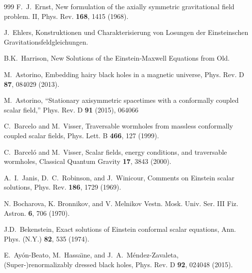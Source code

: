 \documentclass[aps,preprint,groupedaddress,nofootinbib,superscriptaddress,showkeys,showpacs,eqsecnum,amsmath,amssymb]{revtex4-1}
\begin{document}
\begin{thebibliography}{999}
F.~J.~Ernst,
New formulation of the axially symmetric gravitational field problem. II,
Phys. Rev. \textbf{168}, 1415 (1968).


J.~Ehlers,
Konstruktionen und Charakterisierung von Losungen der Einsteinschen Gravitationsfeldgleichungen.

B.K.~Harrison,
New Solutions of the Einstein‐Maxwell Equations from Old.

M.~Astorino,
Embedding hairy black holes in a magnetic universe,
Phys. Rev. D \textbf{87}, 084029 (2013).


M.~Astorino,
``Stationary axisymmetric spacetimes with a conformally coupled scalar field,''
Phys. Rev. D \textbf{91} (2015), 064066

C.~Barcelo and M.~Visser,
Traversable wormholes from massless conformally coupled scalar fields,
Phys. Lett. B \textbf{466}, 127 (1999).

C.~Barcel\'o and M.~Visser,
Scalar fields, energy conditions, and traversable wormholes,
Classical Quantum Gravity \textbf{17}, 3843 (2000).


A.~I.~Janis, D.~C.~Robinson, and J.~Winicour,
Comments on Einstein scalar solutions,
Phys. Rev. \textbf{186}, 1729 (1969).

N. Bocharova, K. Bronnikov, and V. Melnikov Vestn. Mosk.
Univ. Ser. III Fiz. Astron. \textbf{6}, 706 (1970).


J.D.~Bekenstein,
Exact solutions of Einstein conformal scalar equations,
Ann. Phys. (N.Y.) \textbf{82}, 535 (1974).


E.~Ay\'on-Beato, M.~Hassa\"\i{}ne, and J.~A.~M\'endez-Zavaleta,
(Super-)renormalizably dressed black holes,
Phys. Rev. D \textbf{92}, 024048 (2015).



\end{thebibliography}
\end{document}
